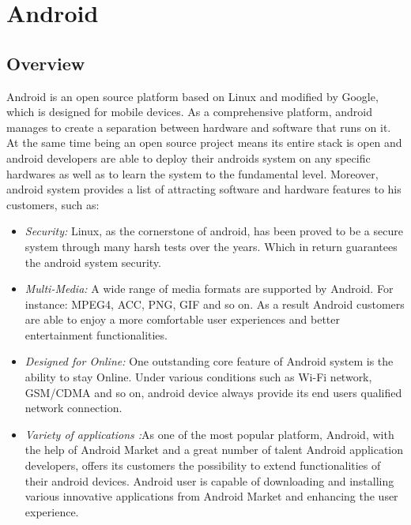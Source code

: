 \section{Android}
\subsection{Overview}
Android is an open source platform based on Linux and modified by Google, which is designed for mobile devices. As a comprehensive platform, android manages to create a separation between hardware and software that runs on it.  At the same time being an open source project means its entire stack is open and android developers are able to deploy their androids system on any specific hardwares as well as to learn the system to the fundamental level.\cite{learn_android}
Moreover, android system provides a list of attracting software and hardware features to his customers, such as:
\begin{itemize}
\item \emph{Security:} Linux, as the cornerstone of android, has been proved to be a secure system through many harsh tests over the years. Which in return guarantees the android system security. \cite{learn_android}
\item \emph{Multi-Media:} A wide range of media formats are supported by Android. For instance: MPEG4, ACC, PNG, GIF and so on\cite{android_media}. As a result Android customers are able to enjoy a more comfortable user experiences and better entertainment functionalities.
\item \emph{Designed for Online:} One outstanding core feature of Android system is the ability to stay Online\cite{android_forensics}. Under various conditions such as Wi-Fi network, GSM/CDMA and so on, android device always provide its end users qualified network connection.
\item \emph{Variety of applications :}As one of the most popular platform,  Android, with the help of Android Market and a great number of talent Android application developers, offers its customers the possibility to extend  functionalities of their android devices\cite{android_forensics}. Android user is capable of downloading and installing various innovative applications from Android Market and enhancing the user experience.
\end{itemize}
